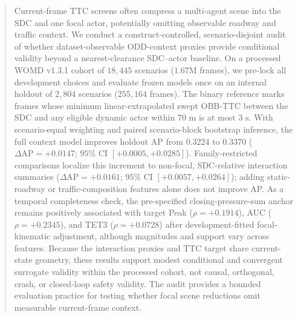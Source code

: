 \begin{abstract}
Current-frame TTC screens often compress a multi-agent scene into the SDC and one focal actor, potentially omitting observable roadway and traffic context. We conduct a construct-controlled, scenario-disjoint audit of whether dataset-observable ODD-context proxies provide conditional validity beyond a nearest-clearance SDC--actor baseline. On a processed WOMD v1.3.1 cohort of $18,445$ scenarios ($1.67\text{M}$ frames), we pre-lock all development choices and evaluate frozen models once on an internal holdout of $2,804$ scenarios ($255,164$ frames). The binary reference marks frames whose minimum linear-extrapolated swept OBB-TTC between the SDC and any eligible dynamic actor within $70\text{ m}$ is at most $3\text{ s}$. With scenario-equal weighting and paired scenario-block bootstrap inference, the full context model improves holdout AP from $0.3224$ to $0.3370$ ($\Delta\text{AP} = +0.0147$; $95\%$ CI $[+0.0005, +0.0285]$). Family-restricted comparisons localize this increment to non-focal, SDC-relative interaction summaries ($\Delta\text{AP} = +0.0161$; $95\%$ CI $[+0.0057, +0.0264]$); adding static-roadway or traffic-composition features alone does not improve AP. As a temporal completeness check, the pre-specified closing-pressure-sum anchor remains positively associated with target Peak ($\rho = +0.1914$), AUC ($\rho = +0.2345$), and TET3 ($\rho = +0.0728$) after development-fitted focal-kinematic adjustment, although magnitudes and support vary across features. Because the interaction proxies and TTC target share current-state geometry, these results support modest conditional and convergent surrogate validity within the processed cohort, not causal, orthogonal, crash, or closed-loop safety validity. The audit provides a bounded evaluation practice for testing whether focal scene reductions omit measurable current-frame context.
\end{abstract}
